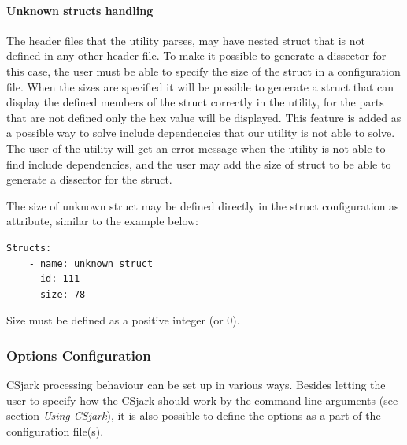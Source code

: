 \documentclass[A4paper,10pt,english]{sphinxmanual}
\begin{document}
\paragraph{Unknown structs handling}
\label{user/config:unknown-structs-handling}
The header files that the utility parses, may have nested struct that is not defined in any other header file. To make  it possible to generate a dissector for this case, the user must be able to specify the size of the struct in a configuration file. When the sizes are specified it will be possible to generate a struct that can display the defined members of the struct correctly in the utility, for the parts that are not defined only the hex value will be displayed. This feature is added as a possible way to solve include dependencies that our utility is not able to solve. The user of the utility will get an error message when the utility is not able to find include dependencies, and the user may add the size of struct to be able to generate a dissector for the struct.

The size of unknown struct may be defined directly in the struct configuration as  attribute, similar to the example below:

\begin{Verbatim}[commandchars=\\\{\}]
Structs:
    - name: unknown struct
      id: 111
      size: 78
\end{Verbatim}

Size must be defined as a positive integer (or 0).


\subsubsection{Options Configuration}
\label{user/config:options-configuration}
CSjark processing behaviour can be set up in various ways. Besides letting the user to specify how the CSjark should work by the command line arguments (see section {\hyperref[user/use:use]{\emph{Using CSjark}}}), it is also possible to define the options as a part of the configuration file(s).
\end{document}
